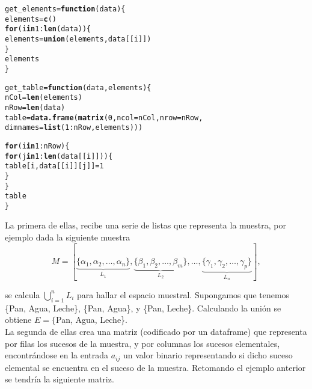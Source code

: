 \documentclass[12pt]{report}\usepackage[]{graphicx}\usepackage[dvipsnames]{xcolor}
\makeatletter
\newcommand{\hlnum}[1]{\textcolor[rgb]{0.686,0.059,0.569}{#1}}%
\newcommand{\hlopt}[1]{\textcolor[rgb]{0,0,0}{#1}}%
\newcommand{\hlstd}[1]{\textcolor[rgb]{0.345,0.345,0.345}{#1}}%
\newcommand{\hlkwa}[1]{\textcolor[rgb]{0.161,0.373,0.58}{\textbf{#1}}}%
\newcommand{\hlkwb}[1]{\textcolor[rgb]{0.69,0.353,0.396}{#1}}%
\newcommand{\hlkwc}[1]{\textcolor[rgb]{0.333,0.667,0.333}{#1}}%
\newcommand{\hlkwd}[1]{\textcolor[rgb]{0.737,0.353,0.396}{\textbf{#1}}}%
\newenvironment{kframe}{%
 \def\at@end@of@kframe{}%
 \ifinner\ifhmode%
  \def\at@end@of@kframe{\end{minipage}}%
  \begin{minipage}{\columnwidth}%
 \fi\fi%
 \def\FrameCommand##1{\hskip\@totalleftmargin \hskip-\fboxsep
 \colorbox{shadecolor}{##1}\hskip-\fboxsep
     \hskip-\linewidth \hskip-\@totalleftmargin \hskip\columnwidth}%
 \MakeFramed {\advance\hsize-\width
   \@totalleftmargin\z@ \linewidth\hsize
   \@setminipage}}%
 {\par\unskip\endMakeFramed%
 \at@end@of@kframe}
\newenvironment{knitrout}{}{} %
\makeatother
\begin{document}
\begin{knitrout}
\color{fgcolor}\begin{kframe}
\begin{alltt}
\hlstd{get_elements} \hlkwb{=} \hlkwa{function}\hlstd{(}\hlkwc{data}\hlstd{) \{}
        \hlstd{elements} \hlkwb{=} \hlkwd{c}\hlstd{()}
        \hlkwa{for} \hlstd{(i} \hlkwa{in} \hlnum{1}\hlopt{:}\hlkwd{len}\hlstd{(data)) \{}
                \hlstd{elements} \hlkwb{=} \hlkwd{union}\hlstd{(elements, data[[i]])}
        \hlstd{\}}
        \hlstd{elements}
\hlstd{\}}

\hlstd{get_table} \hlkwb{=} \hlkwa{function}\hlstd{(}\hlkwc{data}\hlstd{,} \hlkwc{elements}\hlstd{) \{}
        \hlstd{nCol} \hlkwb{=} \hlkwd{len}\hlstd{(elements)}
        \hlstd{nRow} \hlkwb{=} \hlkwd{len}\hlstd{(data)}
        \hlstd{table} \hlkwb{=} \hlkwd{data.frame}\hlstd{(}\hlkwd{matrix}\hlstd{(}\hlnum{0}\hlstd{,} \hlkwc{ncol} \hlstd{= nCol,} \hlkwc{nrow} \hlstd{= nRow,}
                \hlkwc{dimnames} \hlstd{=} \hlkwd{list}\hlstd{(}\hlnum{1}\hlopt{:}\hlstd{nRow, elements)))}

        \hlkwa{for} \hlstd{(i} \hlkwa{in} \hlnum{1}\hlopt{:}\hlstd{nRow) \{}
                \hlkwa{for} \hlstd{(j} \hlkwa{in} \hlnum{1}\hlopt{:}\hlkwd{len}\hlstd{(data[[i]])) \{}
                        \hlstd{table[i, data[[i]][j]]} \hlkwb{=} \hlnum{1}
                \hlstd{\}}
        \hlstd{\}}
        \hlstd{table}
\hlstd{\}}
\end{alltt}
\end{kframe}
\end{knitrout}
			
			La primera de ellas, recibe una serie de listas que representa la muestra, por ejemplo dada la siguiente muestra
			$$
			M = [\underbrace{\{\alpha_1, \alpha_2, \ldots, \alpha_n\}}_{L_1}, \underbrace{\{\beta_{1}, \beta_{2}, \ldots, \beta_{m}\}}_{L_2}, \ldots, \underbrace{\{\gamma_1, \gamma_2, \ldots, \gamma_{p}\}}_{L_n}], 
			$$
			
			se calcula $\bigcup_{i=1}^{n} L_i$ para hallar el espacio muestral. Supongamos que tenemos \{Pan, Agua, Leche\}, \{Pan, Agua\}, y \{Pan, Leche\}. Calculando la unión se obtiene $E = \{$Pan, Agua, Leche\}. \\
			
			La segunda de ellas crea una matriz (codificado por un dataframe) que representa por filas los sucesos de la muestra, y por columnas los sucesos elementales, encontrándose en la entrada $a_{ij}$ un valor binario representando si dicho suceso elemental se encuentra en el suceso de la muestra. Retomando el ejemplo anterior se tendría la siguiente matriz. 
			
\end{document}
